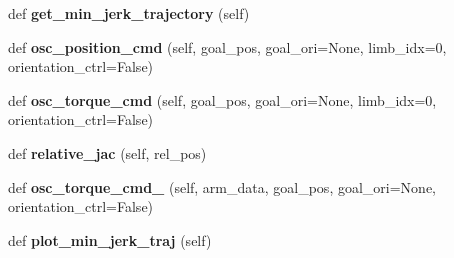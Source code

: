 \begin{DoxyCompactItemize}
\item 
\hypertarget{classaml__ctrl_1_1classical__controllers_1_1_min_jerk_controller_affaeff25c410f9d0617b551392c4fcdf}{}\label{classaml__ctrl_1_1classical__controllers_1_1_min_jerk_controller_affaeff25c410f9d0617b551392c4fcdf} 
def {\bfseries get\+\_\+min\+\_\+jerk\+\_\+trajectory} (self)
\item 
\hypertarget{classaml__ctrl_1_1classical__controllers_1_1_min_jerk_controller_aa4cdd987c45c52d39f38ec3ff83f8f1d}{}\label{classaml__ctrl_1_1classical__controllers_1_1_min_jerk_controller_aa4cdd987c45c52d39f38ec3ff83f8f1d} 
def {\bfseries osc\+\_\+position\+\_\+cmd} (self, goal\+\_\+pos, goal\+\_\+ori=None, limb\+\_\+idx=0, orientation\+\_\+ctrl=False)
\item 
\hypertarget{classaml__ctrl_1_1classical__controllers_1_1_min_jerk_controller_a54182a9ca601563ef471063650978820}{}\label{classaml__ctrl_1_1classical__controllers_1_1_min_jerk_controller_a54182a9ca601563ef471063650978820} 
def {\bfseries osc\+\_\+torque\+\_\+cmd} (self, goal\+\_\+pos, goal\+\_\+ori=None, limb\+\_\+idx=0, orientation\+\_\+ctrl=False)
\item 
\hypertarget{classaml__ctrl_1_1classical__controllers_1_1_min_jerk_controller_a9b88c1b2a047a254b7e59c4cc0627995}{}\label{classaml__ctrl_1_1classical__controllers_1_1_min_jerk_controller_a9b88c1b2a047a254b7e59c4cc0627995} 
def {\bfseries relative\+\_\+jac} (self, rel\+\_\+pos)
\item 
\hypertarget{classaml__ctrl_1_1classical__controllers_1_1_min_jerk_controller_a05fe88df81c713f6d4a4eb683c463f57}{}\label{classaml__ctrl_1_1classical__controllers_1_1_min_jerk_controller_a05fe88df81c713f6d4a4eb683c463f57} 
def {\bfseries osc\+\_\+torque\+\_\+cmd\+\_} (self, arm\+\_\+data, goal\+\_\+pos, goal\+\_\+ori=None, orientation\+\_\+ctrl=False)
\item 
\hypertarget{classaml__ctrl_1_1classical__controllers_1_1_min_jerk_controller_a8f6ff35c217c121c2de2e805c173845b}{}\label{classaml__ctrl_1_1classical__controllers_1_1_min_jerk_controller_a8f6ff35c217c121c2de2e805c173845b} 
def {\bfseries plot\+\_\+min\+\_\+jerk\+\_\+traj} (self)
\end{DoxyCompactItemize}
